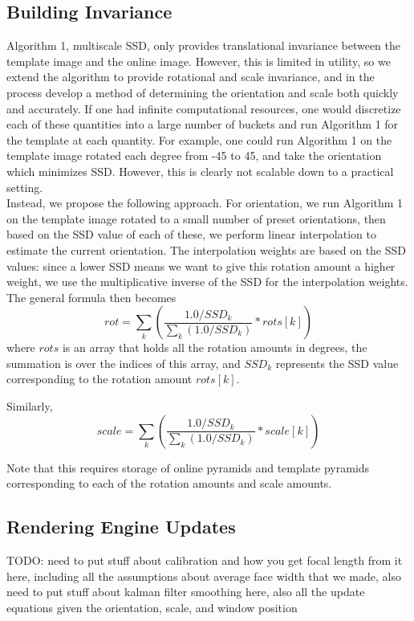 \documentclass[10pt,twocolumn,letterpaper]{article}
\begin{document}
\subsection*{Building Invariance}
Algorithm 1, multiscale SSD, only provides translational invariance between the
template image and the online image. However, this is limited in utility, so we
extend the algorithm to provide rotational and scale invariance, and in the
process develop a method of determining the orientation and scale both quickly
and accurately. If one had infinite computational resources, one would discretize
each of these quantities into a large number of buckets and run Algorithm 1 for
the template at each quantity. For example, one could run Algorithm 1 on the template
image rotated each degree from -45 to 45, and take the orientation which minimizes SSD.
However, this is clearly not scalable down to a practical setting.\\

Instead, we propose the following approach. For orientation, we run Algorithm 1
on the template image rotated to a small number of preset orientations, then based on the SSD value
of each of these, we perform linear interpolation to estimate the current orientation.
The interpolation weights are based on the SSD values: since a lower SSD means we want
to give this rotation amount a higher weight, we use the multiplicative inverse of the
SSD for the interpolation weights. The general formula then becomes
$$rot = \displaystyle\sum_{k}(\dfrac{1.0 / SSD_{k}}{\sum_{k}(1.0 / SSD_{k})} * rots[k])$$
where $rots$ is an array that holds all the rotation amounts in degrees,
the summation is over the indices of this array, and $SSD_{k}$ represents the SSD value
corresponding to the rotation amount $rots[k]$.

Similarly,
$$scale = \displaystyle\sum_{k}(\dfrac{1.0 / SSD_{k}}{\sum_{k}(1.0 / SSD_{k})} * scale[k])$$

Note that this requires storage of online pyramids and template pyramids corresponding
to each of the rotation amounts and scale amounts.

\subsection*{Rendering Engine Updates}
TODO: need to put stuff about calibration and how you get focal length from
it here, including all the assumptions about average face width that we made,
also need to put stuff about kalman filter smoothing here, also all the update
equations given the orientation, scale, and window position
\end{document}
